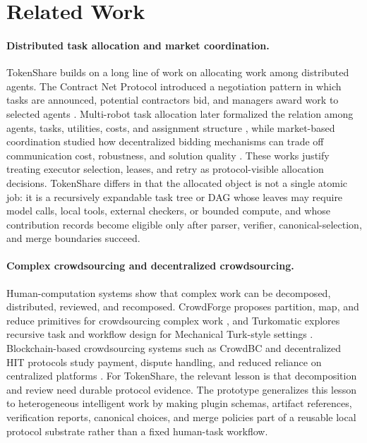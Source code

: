 \documentclass{article}
\theoremstyle{plain}
\begin{document}
\makeatletter
\let\@makecaption\TSoldmakecaption
\makeatother
\endgroup
\normalcolor



\section{Related Work}

\paragraph{Distributed task allocation and market coordination.}
{\color{blue}
TokenShare builds on a long line of work on allocating work among distributed agents. The Contract Net Protocol introduced a negotiation pattern in which tasks are announced, potential contractors bid, and managers award work to selected agents \citep{smith1980contract}. Multi-robot task allocation later formalized the relation among agents, tasks, utilities, costs, and assignment structure \citep{gerkey2004formal}, while market-based coordination studied how decentralized bidding mechanisms can trade off communication cost, robustness, and solution quality \citep{dias2006market}. These works justify treating executor selection, leases, and retry as protocol-visible allocation decisions. TokenShare differs in that the allocated object is not a single atomic job: it is a recursively expandable task tree or DAG whose leaves may require model calls, local tools, external checkers, or bounded compute, and whose contribution records become eligible only after parser, verifier, canonical-selection, and merge boundaries succeed.
}

\paragraph{Complex crowdsourcing and decentralized crowdsourcing.}
{\color{blue}
Human-computation systems show that complex work can be decomposed, distributed, reviewed, and recomposed. CrowdForge proposes partition, map, and reduce primitives for crowdsourcing complex work \citep{kittur2011crowdforge}, and Turkomatic explores recursive task and workflow design for Mechanical Turk-style settings \citep{kulkarni2011turkomatic}. Blockchain-based crowdsourcing systems such as CrowdBC and decentralized HIT protocols study payment, dispute handling, and reduced reliance on centralized platforms \citep{li2018crowdbc,liang2022decentralizedhit}. For TokenShare, the relevant lesson is that decomposition and review need durable protocol evidence. The prototype generalizes this lesson to heterogeneous intelligent work by making plugin schemas, artifact references, verification reports, canonical choices, and merge policies part of a reusable local protocol substrate rather than a fixed human-task workflow.
}
\end{document}
